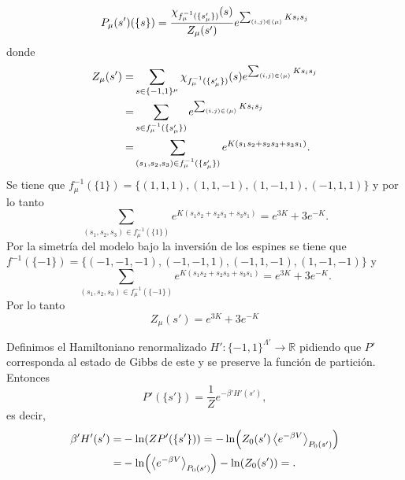 \documentclass{article}
\begin{document}
\begin{enumerate}
\begin{equation}
P_\mu(s')(\{s\})=\frac{\chi_{f_\mu^{-1}(\{s'_\mu\})}(s)}{Z_\mu(s')}e^{\sum_{(i,j)\in\ev{\mu}}Ks_is_j}
\end{equation} 
donde
\begin{align}
\begin{split}
Z_\mu(s')=&\sum_{s\in\{-1,1\}^\mu}\chi_{f_\mu^{-1}(\{s'_\mu\})}(s)e^{\sum_{(i,j)\in\ev{\mu}}Ks_is_j}\\
=&\sum_{s\in f_\mu^{-1}(\{s'_\mu\})}e^{\sum_{(i,j)\in\ev{\mu}}Ks_is_j}\\
=&\sum_{(s_1,s_2,s_3)\in f_\mu^{-1}(\{s'_\mu\})}e^{K(s_1s_2+s_2s_3+s_3s_1)}.
\end{split}
\end{align}
Se tiene que $f_\mu^{-1}(\{1\})=\{(1,1,1),(1,1,-1),(1,-1,1),(-1,1,1)\}$ y por lo tanto
\begin{equation}
\sum_{(s_1,s_2,s_3)\in f_\mu^{-1}(\{1\})}e^{K(s_1s_2+s_2s_3+s_3s_1)}=e^{3K}+3e^{-K}.
\end{equation}
Por la simetría del modelo bajo la inversión de los espines se tiene que $f^{-1}(\{-1\})=\{(-1,-1,-1),(-1,-1,1),(-1,1,-1),(1,-1,-1)\}$ y
\begin{equation}
\sum_{(s_1,s_2,s_3)\in f_\mu^{-1}(\{-1\})}e^{K(s_1s_2+s_2s_3+s_3s_1)}=e^{3K}+3e^{-K}.
\end{equation}
Por lo tanto
\begin{equation}
Z_\mu(s')=e^{3K}+3e^{-K}
\end{equation}

Definimos el Hamiltoniano renormalizado $H':\{-1,1\}^{\Lambda'}\rightarrow\mathbb{R}$ pidiendo que $P'$ corresponda al estado de Gibbs de este y se preserve la función de partición. Entonces
\begin{equation}
P'(\{s'\})=\frac{1}{Z}e^{-\beta' H'(s')},
\end{equation}
es decir,
\begin{align}
\begin{split}
\beta' H'(s')=&-\ln(ZP'(\{s'\}))=-\ln(Z_0(s')\ev{e^{-\beta V}}_{P_0(s')})\\
=&-\ln(\ev{e^{-\beta V}}_{P_0(s')})-\ln(Z_0(s'))=.
\end{split}
\end{align}


\end{enumerate}
\end{document}

